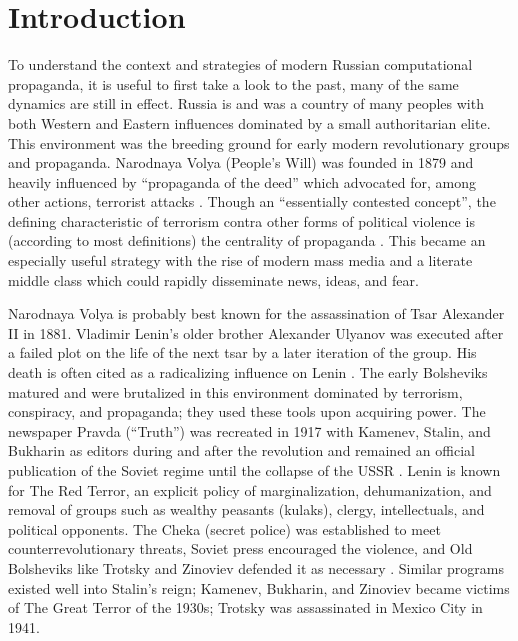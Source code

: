 \section{Introduction}

To understand the context and strategies of modern Russian computational propaganda, it is useful to first take a look to the past, many of the same dynamics are still in effect.
Russia is and was a country of many peoples with both Western and Eastern influences dominated by a small authoritarian elite.
This environment was the breeding ground for early modern revolutionary groups and propaganda.
Narodnaya Volya (People's Will) was founded in 1879 and heavily influenced by ``propaganda of the deed'' which advocated for, among other actions, terrorist attacks \cite[p. 5]{hoffman2017}.
Though an ``essentially contested concept'', the defining characteristic of terrorism contra other forms of political violence is (according to most definitions) the centrality of propaganda \cite[p. 86]{schmid2011}.
This became an especially useful strategy with the rise of modern mass media and a literate middle class which could rapidly disseminate news, ideas, and fear.

Narodnaya Volya is probably best known for the assassination of Tsar Alexander II in 1881.
Vladimir Lenin's older brother Alexander Ulyanov was executed after a failed plot on the life of the next tsar by a later iteration of the group.
His death is often cited as a radicalizing influence on Lenin \cite[p. 60]{service2000}.
The early Bolsheviks matured and were brutalized in this environment dominated by terrorism, conspiracy, and propaganda; they used these tools upon acquiring power.
The newspaper Pravda (``Truth'') was recreated in 1917 with Kamenev, Stalin, and Bukharin as editors during and after the revolution and remained an official publication of the Soviet regime until the collapse of the USSR \cite[p. 209]{trotsky2008} \cite[p. 43]{cohen1980}.
Lenin is known for The Red Terror, an explicit policy of marginalization, dehumanization, and removal of groups such as wealthy peasants (kulaks), clergy, intellectuals, and political opponents.
The Cheka (secret police) was established to meet counterrevolutionary threats, Soviet press encouraged the violence, and Old Bolsheviks like Trotsky and Zinoviev defended it as necessary \cite{melgunoff1927, trotsky2017} \cite[p. 114]{leggett1981}.
Similar programs existed well into Stalin's reign; Kamenev, Bukharin, and Zinoviev became victims of The Great Terror of the 1930s; Trotsky was assassinated in Mexico City in 1941.

